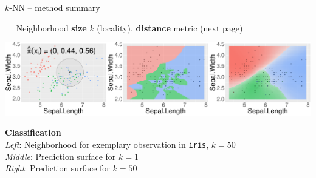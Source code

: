 \begin{frame}{$k$-NN -- method summary}

\medskip

 ~~ Neighborhood \textbf{size} $k$ (locality), 
\textbf{distance} metric (next page)

\vspace{5px}

\begin{minipage}{0.7\textwidth}
  \includegraphics[width=\textwidth]{figure/knn-neighborhood.pdf}
\end{minipage}%
\hfill
\begin{minipage}{0.25\textwidth}
  \tiny
  \raggedright
  \textbf{Classification} \\
  \textit{Left}: Neighborhood for exemplary observation in \texttt{iris}, 
  $k = 50$ \\
  \textit{Middle}: Prediction surface for $k = 1$\\
  \textit{Right}: Prediction surface for $k = 50$
\end{minipage}


\end{frame}
